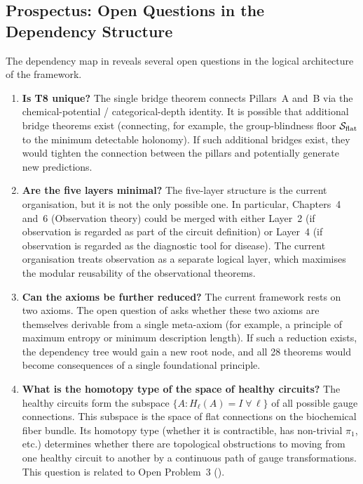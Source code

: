 \subsection{Prospectus: Open Questions in the Dependency Structure}
\label{subsec:ch11-open-dependency}

The dependency map in  reveals several open
questions in the logical architecture of the framework.

\begin{enumerate}[leftmargin=2em]
  \item \textbf{Is T8 unique?}  The single bridge theorem connects Pillars~A
    and~B via the chemical-potential / categorical-depth identity.  It is
    possible that additional bridge theorems exist (connecting, for example, the
    group-blindness floor $\mathcal{S}_{\mathrm{flat}}$ to the minimum detectable
    holonomy).  If such additional bridges exist, they would tighten the
    connection between the pillars and potentially generate new predictions.

  \item \textbf{Are the five layers minimal?}  The five-layer structure is the
    current organisation, but it is not the only possible one.  In particular,
    Chapters~4 and~6 (Observation theory) could be merged with either Layer~2
    (if observation is regarded as part of the circuit definition) or Layer~4
    (if observation is regarded as the diagnostic tool for disease).  The
    current organisation treats observation as a separate logical layer, which
    maximises the modular reusability of the observational theorems.

  \item \textbf{Can the axioms be further reduced?}  The current framework
    rests on two axioms.  The open question of 
    asks whether these two axioms are themselves derivable from a single
    meta-axiom (for example, a principle of maximum entropy or minimum
    description length).  If such a reduction exists, the dependency tree
    would gain a new root node, and all 28 theorems would become consequences
    of a single foundational principle.

  \item \textbf{What is the homotopy type of the space of healthy circuits?}
    The healthy circuits form the subspace $\{A : H_\ell(A) = I \;\forall\,\ell\}$
    of all possible gauge connections.  This subspace is the space of flat
    connections on the biochemical fiber bundle.  Its homotopy type (whether it
    is contractible, has non-trivial $\pi_1$, etc.) determines whether there are
    topological obstructions to moving from one healthy circuit to another by
    a continuous path of gauge transformations.  This question is related to
    Open Problem~3 ().


\end{enumerate}
